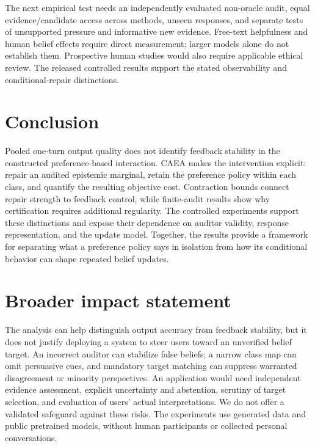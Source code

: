 \documentclass{article}
\begin{document}
The next empirical test needs an independently evaluated non-oracle audit,
equal evidence/candidate access across methods, unseen responses, and
separate tests of unsupported pressure and informative new evidence.
Free-text helpfulness and human belief effects require direct measurement;
larger models alone do not establish them. Prospective human studies would
also require applicable ethical review. The released controlled results
support the stated observability and conditional-repair distinctions.

\section{Conclusion}
Pooled one-turn output quality does not identify feedback stability in the
constructed preference-based interaction. CAEA makes the intervention
explicit: repair an audited epistemic marginal, retain the preference
policy within each class, and quantify the resulting objective cost.
Contraction bounds connect repair strength to feedback control, while
finite-audit results show why certification requires additional regularity.
The controlled experiments support these distinctions and expose their
dependence on auditor validity, response representation, and the update
model. Together, the results provide a framework for separating what a
preference policy says in isolation from how its conditional behavior can
shape repeated belief updates.

\section*{Broader impact statement}
The analysis can help distinguish output accuracy from feedback stability,
but it does not justify deploying a system to steer users toward an
unverified belief target. An incorrect auditor can stabilize false beliefs;
a narrow class map can omit persuasive cues, and mandatory target matching
can suppress warranted disagreement or minority perspectives. An application
would need independent evidence assessment, explicit uncertainty and
abstention, scrutiny of target selection, and evaluation of users' actual
interpretations. We do not offer a validated safeguard against these risks.
The experiments use generated data and public pretrained models, without
human participants or collected personal conversations.


\clearpage


\end{document}
